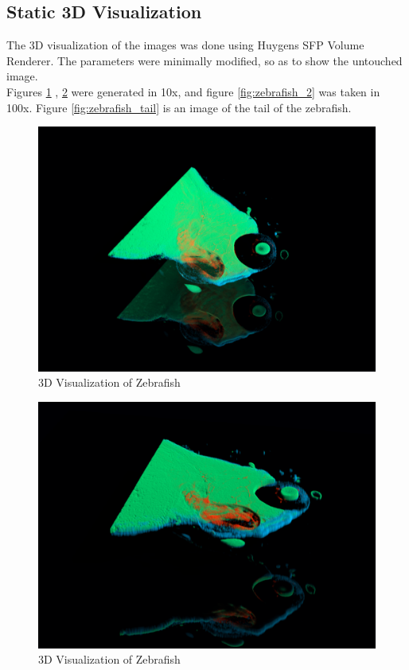 \documentclass{article}
\begin{document}
\subsection*{Static 3D Visualization}
The 3D visualization of the images was done using Huygens SFP Volume Renderer. The parameters were minimally modified, so as to show the untouched image. \\
Figures \ref{fig:zebrafish_0} , \ref{fig:zebrafish_1} were generated in 10x, and figure \ref{fig:zebrafish_2} was taken in 100x. Figure \ref{fig:zebrafish_tail} is an image of the tail of the zebrafish. 
\begin{figure}[h!]
    \centering
    \includegraphics[width=0.75\linewidth]{Report/Images/6.4-9/Image_0.png}
    \caption{3D Visualization of Zebrafish}
    \label{fig:zebrafish_0}
\end{figure}
\begin{figure}[h!]
    \centering
    \includegraphics[width=0.75\linewidth]{Report/Images/6.4-9/image_1.png}
    \caption{3D Visualization of Zebrafish}
    \label{fig:zebrafish_1}
\end{figure}
\end{document}
